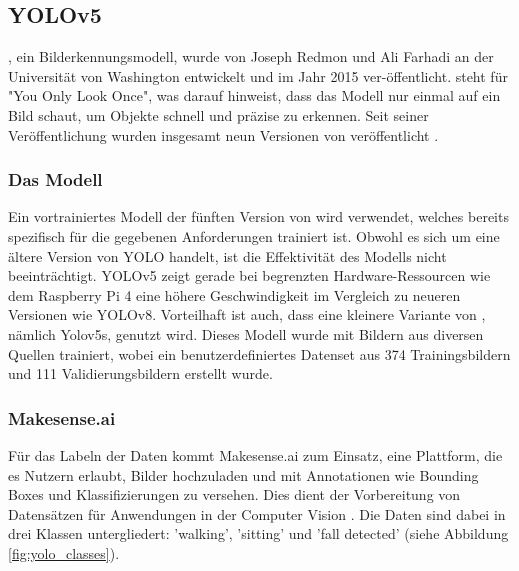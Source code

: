 \subsection{YOLOv5}
, ein Bilderkennungsmodell, wurde von Joseph Redmon und Ali Farhadi an der Universität von Washington entwickelt und im Jahr 2015 ver-öffentlicht.  steht für "You Only Look Once", was darauf hinweist, dass das Modell nur einmal auf ein Bild schaut, um Objekte schnell und präzise zu erkennen. Seit seiner Veröffentlichung wurden insgesamt neun Versionen von  veröffentlicht \cite{Yolo} .

\subsubsection{Das Modell}
Ein vortrainiertes Modell der fünften Version von  wird verwendet, welches bereits spezifisch für die gegebenen Anforderungen trainiert ist. Obwohl es sich um eine ältere Version von YOLO handelt, ist die Effektivität des Modells nicht beeinträchtigt. YOLOv5 zeigt gerade bei begrenzten Hardware-Ressourcen wie dem Raspberry Pi 4 eine höhere Geschwindigkeit im Vergleich zu neueren Versionen wie YOLOv8. Vorteilhaft ist auch, dass eine kleinere Variante von , nämlich Yolov5s, genutzt wird. Dieses Modell wurde mit Bildern aus diversen Quellen trainiert, wobei ein benutzerdefiniertes Datenset aus 374 Trainingsbildern und 111 Validierungsbildern erstellt wurde.

\subsubsection{Makesense.ai}
Für das Labeln der Daten kommt Makesense.ai zum Einsatz, eine Plattform, die es Nutzern erlaubt, Bilder hochzuladen und mit Annotationen wie Bounding Boxes und Klassifizierungen zu versehen. Dies dient der Vorbereitung von Datensätzen für Anwendungen in der Computer Vision \cite{noauthor_make_nodate}. Die Daten sind dabei in drei Klassen untergliedert: 'walking', 'sitting' und 'fall detected' (siehe Abbildung \ref{fig:yolo_classes}).


